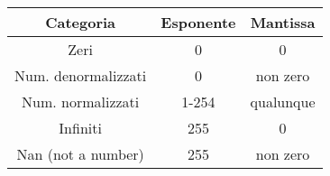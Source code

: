 \documentclass{standalone}
\begin{document}
\begin{tabular}{ ccc }
	\toprule
		Categoria & Esponente & Mantissa\\
	\midrule
		Zeri & 0 & 0 \\\hline
		Num. denormalizzati & 0 & non zero\\\hline
		Num. normalizzati & 1-254 & qualunque\\\hline
		Infiniti & 255 & 0\\\hline
		Nan (not a number) & 255 & non zero\\
	\bottomrule
\end{tabular}
\end{document}
